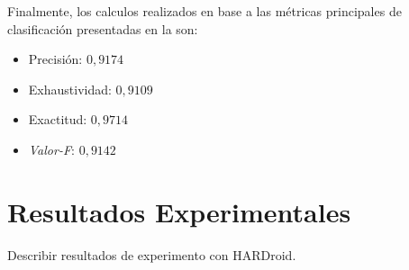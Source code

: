 Finalmente, los calculos realizados en base a las métricas principales
de clasificación presentadas en la  son:
\begin{itemize}
\item Precisión: $0,9174$
\item Exhaustividad: $0,9109$
\item Exactitud: $0,9714$
\item \emph{Valor-F}: $0,9142$
\end{itemize}

\section{Resultados Experimentales}

\label{sec6:resultados}Describir resultados de experimento con HARDroid.
